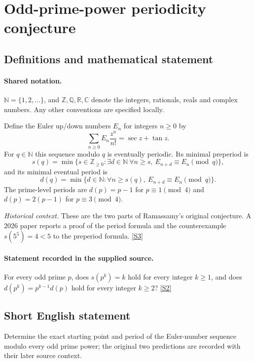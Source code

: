 \documentclass[11pt]{article}
\newcommand{\sref}[2]{\hyperlink{source:#1:#2}{[S#2]}}
\begin{document}
\section{Odd-prime-power periodicity conjecture}\label{statement}

\subsection{Definitions and mathematical statement}

\paragraph{Shared notation.}$\mathbb N=\{1,2,\ldots\}$, and $\mathbb Z,\mathbb Q,\mathbb R,\mathbb C$ denote the integers, rationals, reals and complex numbers. Any other conventions are specified locally.


Define the Euler up/down numbers $E_n$ for integers $n\ge0$ by
\[
\sum_{n\ge0} E_n\frac{z^n}{n!}=\sec z+\tan z.
\]
For $q\in\mathbb N$ this sequence modulo $q$ is eventually periodic. Its minimal preperiod is
\[
s(q)=\min\{s\in\mathbb Z_{\ge0}:\exists d\in\mathbb N\ \forall n\ge s,\ E_{n+d}\equiv E_n\pmod q\},
\]
and its minimal eventual period is
\[
d(q)=\min\{d\in\mathbb N:\forall n\ge s(q),\ E_{n+d}\equiv E_n\pmod q\}.
\]
The prime-level periods are $d(p)=p-1$ for $p\equiv1\pmod4$ and $d(p)=2(p-1)$ for $p\equiv3\pmod4$.\par\textit{Historical context.} These are the two parts of Ramassamy's original conjecture. A 2026 paper reports a proof of the period formula and the counterexample $s(5^5)=4<5$ to the preperiod formula. \sref{statement}{3}
\paragraph{Statement recorded in the supplied source.}
For every odd prime $p$, does $s(p^k)=k$ hold for every integer $k\ge1$, and does $d(p^k)=p^{k-1}d(p)$ hold for every integer $k\ge2$? \sref{statement}{2}
\subsection{Short English statement}
Determine the exact starting point and period of the Euler-number sequence modulo every odd prime power; the original two predictions are recorded with their later source context.
\end{document}
